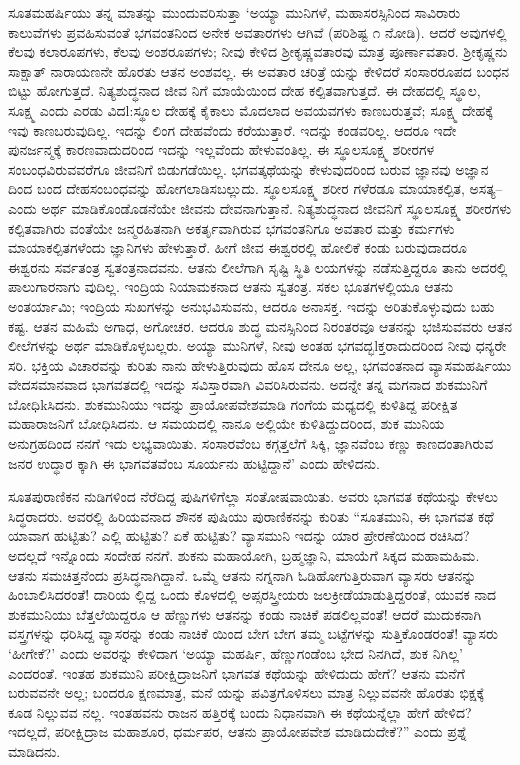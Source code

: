 ಸೂತಮಹರ್ಷಿಯು ತನ್ನ ಮಾತನ್ನು ಮುಂದುವರಿಸುತ್ತಾ ‘ಅಯ್ಯಾ ಮುನಿಗಳೆ, ಮಹಾಸರಸ್ಸಿನಿಂದ ಸಾವಿರಾರು ಕಾಲುವೆಗಳು ಪ್ರವಹಿಸುವಂತೆ ಭಗವಂತನಿಂದ ಅನೇಕ ಅವತಾರಗಳು ಆಗಿವೆ (ಪರಿಶಿಷ್ಟ ೧ ನೋಡಿ). ಆದರೆ ಅವುಗಳಲ್ಲಿ ಕೆಲವು ಕಲಾರೂಪಗಳು, ಕೆಲವು ಅಂಶರೂಪಗಳು; ನೀವು ಕೇಳಿದ ಶ್ರೀಕೃಷ್ಣವತಾರವು ಮಾತ್ರ ಪೂರ್ಣಾವತಾರ. ಶ್ರೀಕೃಷ್ಣನು ಸಾಕ್ಷಾತ್ ನಾರಾಯಣನೇ ಹೊರತು ಆತನ ಅಂಶವಲ್ಲ. ಈ ಅವತಾರ ಚರಿತ್ರೆ ಯನ್ನು ಕೇಳಿದರೆ ಸಂಸಾರರೂಪದ ಬಂಧನ ಬಿಟ್ಟು ಹೋಗುತ್ತದೆ. ನಿತ್ಯಶುದ್ಧನಾದ ಜೀವ ನಿಗೆ ಮಾಯೆಯಿಂದ ದೇಹ ಕಲ್ಪಿತವಾಗುತ್ತದೆ. ಈ ದೇಹದಲ್ಲಿ ಸ್ಥೂಲ, ಸೂಕ್ಷ್ಮ ಎಂದು ಎರಡು ವಿದl:ಸ್ಥೂಲ ದೇಹಕ್ಕೆ ಕೈಕಾಲು ಮೊದಲಾದ ಅವಯವಗಳು ಕಾಣಬರುತ್ತವೆ; ಸೂಕ್ಷ್ಮ ದೇಹಕ್ಕೆ ಇವು ಕಾಣಬರುವುದಿಲ್ಲ. ಇದನ್ನು ಲಿಂಗ ದೇಹವೆಂದು ಕರೆಯುತ್ತಾರೆ. ಇದನ್ನು ಕಂಡವರಿಲ್ಲ. ಆದರೂ ಇದೇ ಪುನರ್ಜನ್ಮಕ್ಕೆ ಕಾರಣವಾದುದರಿಂದ ಇದನ್ನು ಇಲ್ಲವೆಂದು ಹೇಳುವಂತಿಲ್ಲ. ಈ ಸ್ಥೂಲಸೂಕ್ಷ್ಮ ಶರೀರಗಳ ಸಂಬಂಧವಿರುವವರೆಗೂ ಜೀವನಿಗೆ ಬಿಡುಗಡೆಯಿಲ್ಲ. ಭಗವತ್ಕಥೆಯನ್ನು ಕೇಳುವುದರಿಂದ ಬರುವ ಜ್ಞಾನವು ಅಜ್ಞಾನ ದಿಂದ ಬಂದ ದೇಹಸಂಬಂಧವನ್ನು ಹೋಗಲಾಡಿಸಬಲ್ಲುದು. ಸ್ಥೂಲಸೂಕ್ಷ್ಮ ಶರೀರ ಗಳೆರಡೂ ಮಾಯಾಕಲ್ಪಿತ, ಅಸತ್ಯ–ಎಂದು ಅರ್ಥ ಮಾಡಿಕೊಂಡೊಡನೆಯೇ ಜೀವನು ದೇವನಾಗುತ್ತಾನೆ. ನಿತ್ಯಶುದ್ಧನಾದ ಜೀವನಿಗೆ ಸ್ಥೂಲಸೂಕ್ಷ್ಮ ಶರೀರಗಳು ಕಲ್ಪಿತವಾಗಿರು ವಂತೆಯೇ ಜನ್ಮರಹಿತನಾಗಿ ಅಕರ್ತೃವಾಗಿರುವ ಭಗವಂತನಿಗೂ ಅವತಾರ ಮತ್ತು ಕರ್ಮಗಳು ಮಾಯಾಕಲ್ಪಿತಗಳೆಂದು ಜ್ಞಾನಿಗಳು ಹೇಳುತ್ತಾರೆ. ಹೀಗೆ ಜೀವ ಈಶ್ವರರಲ್ಲಿ ಹೋಲಿಕೆ ಕಂಡು ಬರುವುದಾದರೂ ಈಶ್ವರನು ಸರ್ವತಂತ್ರ ಸ್ವತಂತ್ರನಾದವನು. ಆತನು ಲೀಲೆಗಾಗಿ ಸೃಷ್ಟಿ ಸ್ಥಿತಿ ಲಯಗಳನ್ನು ನಡೆಸುತ್ತಿದ್ದರೂ ತಾನು ಅದರಲ್ಲಿ ಪಾಲುಗಾರನಾಗು ವುದಿಲ್ಲ. ಇಂದ್ರಿಯ ನಿಯಾಮಕನಾದ ಆತನು ಸ್ವತಂತ್ರ. ಸಕಲ ಭೂತಗಳಲ್ಲಿಯೂ ಆತನು ಅಂತರ್ಯಾಮಿ; ಇಂದ್ರಿಯ ಸುಖಗಳನ್ನು ಅನುಭವಿಸುವನು, ಆದರೂ ಅನಾಸಕ್ತ. ಇದನ್ನು ಅರಿತುಕೊಳ್ಳುವುದು ಬಹು ಕಷ್ಟ. ಆತನ ಮಹಿಮೆ ಅಗಾಧ, ಅಗೋಚರ. ಆದರೂ ಶುದ್ಧ ಮನಸ್ಸಿನಿಂದ ನಿರಂತರವೂ ಆತನನ್ನು ಭಜಿಸುವವರು ಆತನ ಲೀಲೆಗಳನ್ನು ಅರ್ಥ ಮಾಡಿಕೊಳ್ಳಬಲ್ಲರು. ಅಯ್ಯಾ ಮುನಿಗಳೆ, ನೀವು ಅಂತಹ ಭಗವದ್ಭlಕ್ತರಾದುದರಿಂದ ನೀವು ಧನ್ಯರೇ ಸರಿ. ಭಕ್ತಿಯ ವಿಚಾರವನ್ನು ಕುರಿತು ನಾನು ಹೇಳುತ್ತಿರುವುದು ಹೊಸ ದೇನೂ ಅಲ್ಲ, ಭಗವಂತನಾದ ವ್ಯಾಸಮಹರ್ಷಿಯು ವೇದಸಮಾನವಾದ ಭಾಗವತದಲ್ಲಿ ಇದನ್ನು ಸವಿಸ್ತಾರವಾಗಿ ವಿವರಿಸಿರುವನು. ಅದನ್ನೇ ತನ್ನ ಮಗನಾದ ಶುಕಮುನಿಗೆ ಬೋಧಿkಸಿದನು. ಶುಕಮುನಿಯು ಇದನ್ನು ಪ್ರಾಯೋಪವೇಶಮಾಡಿ ಗಂಗೆಯ ಮಧ್ಯದಲ್ಲಿ ಕುಳಿತಿದ್ದ ಪರೀಕ್ಷಿತ ಮಹಾರಾಜನಿಗೆ ಬೋಧಿಸಿದನು. ಆ ಸಮಯದಲ್ಲಿ ನಾನೂ ಅಲ್ಲಿಯೇ ಕುಳಿತಿದ್ದುದರಿಂದ, ಶುಕ ಮುನಿಯ ಅನುಗ್ರಹದಿಂದ ನನಗೆ ಇದು ಲಭ್ಯವಾಯಿತು. ಸಂಸಾರವೆಂಬ ಕಗ್ಗತ್ತಲೆಗೆ ಸಿಕ್ಕಿ, ಜ್ಞಾನವೆಂಬ ಕಣ್ಣು ಕಾಣದಂತಾಗಿರುವ ಜನರ ಉದ್ಧಾರ ಕ್ಕಾಗಿ ಈ ಭಾಗವತವೆಂಬ ಸೂರ್ಯನು ಹುಟ್ಟಿದ್ದಾನೆ’ ಎಂದು ಹೇಳಿದನು.

ಸೂತಪುರಾಣಿಕನ ನುಡಿಗಳಿಂದ ನೆರೆದಿದ್ದ ಪುಷಿಗಳಿಗೆಲ್ಲಾ ಸಂತೋಷವಾಯಿತು. ಅವರು ಭಾಗವತ ಕಥೆಯನ್ನು ಕೇಳಲು ಸಿದ್ಧರಾದರು. ಅವರಲ್ಲಿ ಹಿರಿಯವನಾದ ಶೌನಕ ಪುಷಿಯು ಪುರಾಣಿಕನನ್ನು ಕುರಿತು “ಸೂತಮುನಿ, ಈ ಭಾಗವತ ಕಥೆ ಯಾವಾಗ ಹುಟ್ಟಿತು? ಎಲ್ಲಿ ಹುಟ್ಟಿತು? ಏಕೆ ಹುಟ್ಟಿತು? ವ್ಯಾಸಮುನಿ ಇದನ್ನು ಯಾರ ಪ್ರೇರಣೆಯಿಂದ ರಚಿಸಿದ? ಅದಲ್ಲದೆ ಇನ್ನೊಂದು ಸಂದೇಹ ನನಗೆ. ಶುಕನು ಮಹಾಯೋಗಿ, ಬ್ರಹ್ಮಜ್ಞಾನಿ, ಮಾಯೆಗೆ ಸಿಕ್ಕದ ಮಹಾಮಹಿಮ. ಆತನು ಸಮಚಿತ್ತನೆಂದು ಪ್ರಸಿದ್ಧನಾಗಿದ್ದಾನೆ. ಒಮ್ಮೆ ಆತನು ನಗ್ನನಾಗಿ ಓಡಿಹೋಗುತ್ತಿರುವಾಗ ವ್ಯಾಸರು ಆತನನ್ನು ಹಿಂಬಾಲಿಸಿದರಂತೆ! ದಾರಿಯ ಲ್ಲಿದ್ದ ಒಂದು ಕೊಳದಲ್ಲಿ ಅಪ್ಸರಸ್ತ್ರೀಯರು ಜಲಕ್ರೀಡೆಯಾಡುತ್ತಿದ್ದರಂತೆ, ಯುವಕ ನಾದ ಶುಕಮುನಿಯು ಬೆತ್ತಲೆಯಿದ್ದರೂ ಆ ಹೆಣ್ಣುಗಳು ಆತನನ್ನು ಕಂಡು ನಾಚಿಕೆ ಪಡಲಿಲ್ಲವಂತೆ! ಆದರೆ ಮುದುಕನಾಗಿ ವಸ್ತ್ರಗಳನ್ನು ಧರಿಸಿದ್ದ ವ್ಯಾಸರನ್ನು ಕಂಡು ನಾಚಿಕೆ ಯಿಂದ ಬೇಗ ಬೇಗ ತಮ್ಮ ಬಟ್ಟೆಗಳನ್ನು ಸುತ್ತಿಕೊಂಡರಂತೆ! ವ್ಯಾಸರು ‘ಹೀಗೇಕೆ?’ ಎಂದು ಅವರನ್ನು ಕೇಳಿದಾಗ ‘ಅಯ್ಯಾ ಮಹರ್ಷಿ, ಹೆಣ್ಣುಗಂಡೆಂಬ ಭೇದ ನಿನಗಿದೆ, ಶುಕ ನಿಗಿಲ್ಲ’ ಎಂದರಂತೆ. ಇಂತಹ ಶುಕಮುನಿ ಪರೀಕ್ಷಿದ್ರಾಜನಿಗೆ ಭಾಗವತ ಕಥೆಯನ್ನು ಹೇಳಿದುದು ಹೇಗೆ? ಆತನು ಮನೆಗೆ ಬರುವವನೇ ಅಲ್ಲ; ಬಂದರೂ ಕ್ಷಣಮಾತ್ರ, ಮನೆ ಯನ್ನು ಪವಿತ್ರಗೊಳಿಸಲು ಮಾತ್ರ ನಿಲ್ಲುವವನೇ ಹೊರತು ಭಿಕ್ಷಕ್ಕೆ ಕೂಡ ನಿಲ್ಲುವವ ನಲ್ಲ. ಇಂತಹವನು ರಾಜನ ಹತ್ತಿರಕ್ಕೆ ಬಂದು ನಿಧಾನವಾಗಿ ಈ ಕಥೆಯನ್ನೆಲ್ಲಾ ಹೇಗೆ ಹೇಳಿದ? ಇದಲ್ಲದೆ, ಪರೀಕ್ಷಿದ್ರಾಜ ಮಹಾಶೂರ, ಧರ್ಮಪರ, ಆತನು ಪ್ರಾಯೋಪವೇಶ ಮಾಡಿದುದೇಕೆ?” ಎಂದು ಪ್ರಶ್ನೆ ಮಾಡಿದನು.

